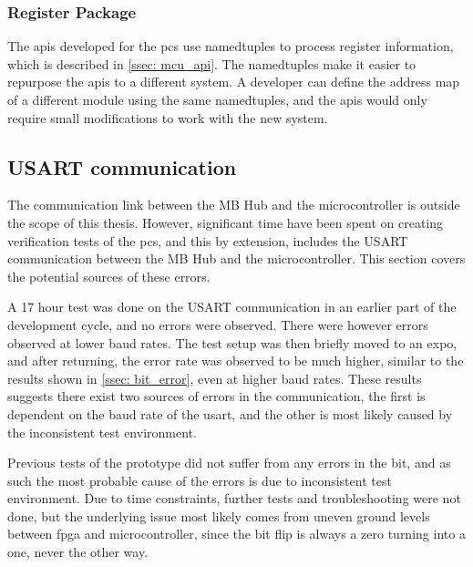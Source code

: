 \documentclass[main.tex]{subfiles}
\begin{document}
 \subsubsection{Register Package}
 
The \gls{api}s developed for the \gls{pcs} use namedtuples to process register information, which is described in \autoref{ssec: mcu_api}. The namedtuples make it easier to repurpose the \gls{api}s to a different system. A developer can define the address map of a different module using the same namedtuples, and the \gls{api}s would only require small modifications to work with the new system.
 
\subsection{USART communication}

The communication link between the MB Hub and the microcontroller is outside the scope of this thesis. However, significant time have been spent on creating verification tests of the \gls{pcs}, and this by extension, includes the USART communication between the MB Hub and the microcontroller. This section covers the potential sources of these errors.

A 17 hour test was done on the USART communication in an earlier part of the development cycle, and no errors were observed. There were however errors observed at lower baud rates. The test setup was then briefly moved to an expo, and after returning, the error rate was observed to be much higher, similar to the results shown in \autoref{ssec: bit_error}, even at higher baud rates. These results suggests there exist two sources of errors in the communication, the first is dependent on the baud rate of the \gls{usart}, and the other is most likely caused by the inconsistent test environment.

Previous tests of the prototype did not suffer from any errors in the bit, and as such the most probable cause of the errors is due to inconsistent test environment. Due to time constraints, further tests and troubleshooting were not done, but the underlying issue most likely comes from uneven ground levels between \gls{fpga} and microcontroller, since the bit flip is always a zero turning into a one, never the other way.
\end{document}
